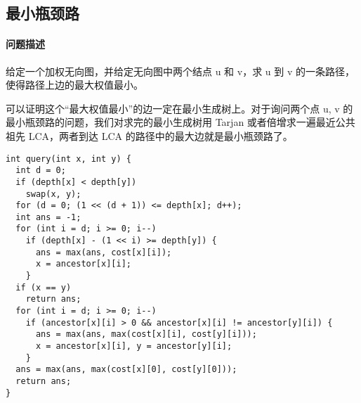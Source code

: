 \subsection{最小瓶颈路}
\paragraph{问题描述} 给定一个加权无向图，并给定无向图中两个结点 u 和 v，求 u 到 v 的一条路径，使得路径上边的最大权值最小。
\par 可以证明这个“最大权值最小”的边一定在最小生成树上。对于询问两个点 u, v 的最小瓶颈路的问题，我们对求完的最小生成树用 Tarjan 或者倍增求一遍最近公共祖先 LCA，两者到达 LCA 的路径中的最大边就是最小瓶颈路了。
\begin{verbatim}
int query(int x, int y) {
  int d = 0;
  if (depth[x] < depth[y])
    swap(x, y);
  for (d = 0; (1 << (d + 1)) <= depth[x]; d++);
  int ans = -1;
  for (int i = d; i >= 0; i--)
    if (depth[x] - (1 << i) >= depth[y]) {
      ans = max(ans, cost[x][i]);
      x = ancestor[x][i];
    }
  if (x == y)
    return ans;
  for (int i = d; i >= 0; i--)
    if (ancestor[x][i] > 0 && ancestor[x][i] != ancestor[y][i]) {
      ans = max(ans, max(cost[x][i], cost[y][i]));
      x = ancestor[x][i], y = ancestor[y][i];
    }
  ans = max(ans, max(cost[x][0], cost[y][0]));
  return ans;
}
\end{verbatim}